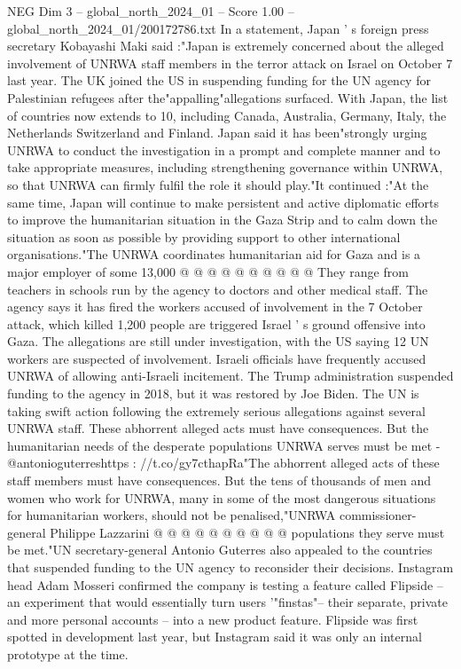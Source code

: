 \begin{textsample}{NEG Dim 3 – global\_north\_2024\_01 – Score 1.00 – global\_north\_2024\_01/200172786.txt}  \label{ex:f3_neg_237}
In a statement, Japan ' s foreign press secretary Kobayashi Maki said :"Japan is extremely concerned about the alleged involvement of UNRWA staff members in the terror attack on Israel on October 7 last year.
The UK joined the US in suspending funding for the UN agency for Palestinian refugees after the"appalling"allegations surfaced.
With Japan, the list of countries now extends to 10, including Canada, Australia, Germany, Italy, the Netherlands Switzerland and Finland.
Japan said it has been"strongly urging UNRWA to conduct the investigation in a prompt and complete manner and to take appropriate measures, including strengthening governance within UNRWA, so that UNRWA can firmly fulfil the role it should play."It continued :"At the same time, Japan will continue to make persistent and active diplomatic efforts to improve the humanitarian situation in the Gaza Strip and to calm down the situation as soon as possible by providing support to other international organisations."The UNRWA coordinates humanitarian aid for Gaza and is a major employer of some 13,000 @ @ @ @ @ @ @ @ @ @ They range from teachers in schools run by the agency to doctors and other medical staff.
The agency says it has fired the workers accused of involvement in the 7 October attack, which killed 1,200 people are triggered Israel ' s ground offensive into Gaza.
The allegations are still under investigation, with the US saying 12 UN workers are suspected of involvement.
Israeli officials have frequently accused UNRWA of allowing anti-Israeli incitement.
The Trump administration suspended funding to the agency in 2018, but it was restored by Joe Biden.
The UN is taking swift action following the extremely serious allegations against several UNRWA staff.
These abhorrent alleged acts must have consequences.
But the humanitarian needs of the desperate populations UNRWA serves must be met - @antonioguterreshttps : //t.co/gy7cthapRa"The abhorrent alleged acts of these staff members must have consequences.
But the tens of thousands of men and women who work for UNRWA, many in some of the most dangerous situations for humanitarian workers, should not be penalised,"UNRWA commissioner-general Philippe Lazzarini @ @ @ @ @ @ @ @ @ @ populations they serve must be met."UN secretary-general Antonio Guterres also appealed to the countries that suspended funding to the UN agency to reconsider their decisions.
Instagram head Adam Mosseri confirmed the company is testing a feature called Flipside -- an experiment that would essentially turn users '"finstas"-- their separate, private and more personal accounts -- into a new product feature.
Flipside was first spotted in development last year, but Instagram said it was only an internal prototype at the time.

\end{textsample}
